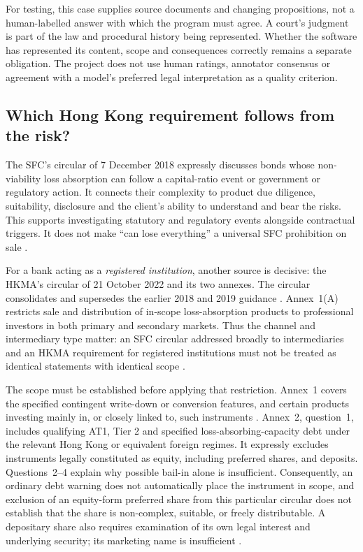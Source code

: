 \documentclass[12pt,a4paper,oneside,openany]{book}
\begin{document}
For testing, this case supplies source documents and changing propositions,
not a human-labelled answer with which the program must agree. A court's
judgment is part of the law and procedural history being represented. Whether
the software has represented its content, scope and consequences correctly
remains a separate obligation. The project does not use human ratings,
annotator consensus or agreement with a model's preferred legal interpretation
as a quality criterion.

\subsection{Which Hong Kong requirement follows from the risk?}

The SFC's circular of 7 December 2018 expressly discusses bonds whose
non-viability loss absorption can follow a capital-ratio event or government
or regulatory action. It connects their complexity to product due diligence,
suitability, disclosure and the client's ability to understand and bear the
risks. This supports investigating statutory and regulatory events alongside
contractual triggers. It does not make ``can lose everything'' a universal
SFC prohibition on sale \citep[discussion of NVLA bonds and selling practices]{sfcnvla2018}.

For a bank acting as a \emph{registered institution}, another source is decisive:
the HKMA's circular of 21 October 2022 and its two annexes. The circular
consolidates and supersedes the earlier 2018 and 2019 guidance
\citep{hkmalac2022}. Annex~1(A)
restricts sale and distribution of in-scope loss-absorption products to
professional investors in both primary and secondary markets. Thus the channel
and intermediary type matter: an SFC circular addressed broadly to
intermediaries and an HKMA requirement for registered institutions must not be
treated as identical statements with identical scope
\citep[applicability and section~A]{hkmalacannex2022}.

The scope must be established before applying that restriction. Annex~1 covers
the specified contingent write-down or conversion features, and certain
products investing mainly in, or closely linked to, such instruments
\citep[applicability]{hkmalacannex2022}.
Annex~2, question~1, includes qualifying AT1, Tier 2 and specified
loss-absorbing-capacity debt under the relevant Hong Kong or equivalent foreign
regimes. It expressly excludes instruments legally constituted as equity,
including preferred shares, and deposits. Questions~2--4 explain why possible
bail-in alone is insufficient. Consequently, an ordinary debt warning does not
automatically place the instrument in scope, and exclusion of an equity-form
preferred share from this particular circular does not establish that the
share is non-complex, suitable, or freely distributable. A depositary share
also requires examination of its own legal interest and underlying security;
its marketing name is insufficient
\citep[questions~1--4]{hkmalacfaq2022}.
\end{document}

